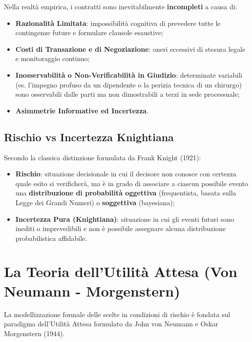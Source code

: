 Nella realtà empirica, i contratti sono inevitabilmente \textbf{incompleti} a causa di:
\begin{itemize}
    \item \textbf{Razionalità Limitata}: impossibilità cognitiva di prevedere tutte le contingenze future e formulare clausole esaustive;
    \item \textbf{Costi di Transazione e di Negoziazione}: oneri eccessivi di stesura legale e monitoraggio continuo;
    \item \textbf{Inosservabilità o Non-Verificabilità in Giudizio}: determinate variabili (es. l'impegno profuso da un dipendente o la perizia tecnica di un chirurgo) sono osservabili dalle parti ma non dimostrabili a terzi in sede processuale;
    \item \textbf{Asimmetrie Informative ed Incertezza}.
\end{itemize}

\subsection{Rischio vs Incertezza Knightiana}
Secondo la classica distinzione formulata da Frank Knight (1921):
\begin{itemize}
    \item \textbf{Rischio}: situazione decisionale in cui il decisore non conosce con certezza quale esito si verificherà, ma è in grado di associare a ciascun possibile evento una \textbf{distribuzione di probabilità oggettiva} (frequentista, basata sulla Legge dei Grandi Numeri) o \textbf{soggettiva} (bayesiana);
    \item \textbf{Incertezza Pura (Knightiana)}: situazione in cui gli eventi futuri sono inediti o imprevedibili e non è possibile assegnare alcuna distribuzione probabilistica affidabile.
\end{itemize}

\section{La Teoria dell'Utilità Attesa (Von Neumann - Morgenstern)}

La modellizzazione formale delle scelte in condizioni di rischio è fondata sul paradigma dell'Utilità Attesa formulato da John von Neumann e Oskar Morgenstern (1944).

